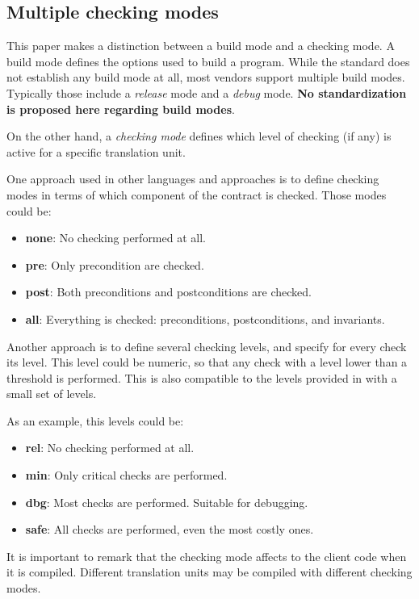 \subsection{Multiple checking modes}

This paper makes a distinction between a build mode and a checking mode. A build
mode defines the options used to build a program. While the standard does not
establish any build mode at all, most vendors support multiple build modes.
Typically those include a \emph{release} mode and a \emph{debug} mode. \textbf{No
standardization is proposed here regarding build modes}.

On the other hand, a \emph{checking mode} defines which level of checking (if any) is
active for a specific translation unit.

One approach used in other languages and approaches is to define checking modes
in terms of which component of the contract is checked.
Those modes could be:

\begin{itemize}
  \item \textbf{none}: No checking performed at all.
  \item \textbf{pre}: Only precondition are checked.
  \item \textbf{post}: Both preconditions and postconditions are checked.
  \item \textbf{all}: Everything is checked: preconditions, postconditions, and
invariants.
\end{itemize}

Another approach is to define several checking levels, and specify for every
check its level. This level could be numeric, so that any check with a level
lower than a threshold is performed. This is also compatible to the levels
provided in \cite{n4135} with a small set of levels. 

As an example, this levels could be:

\begin{itemize}
  \item \textbf{rel}: No checking performed at all.
  \item \textbf{min}: Only critical checks are performed.
  \item \textbf{dbg}: Most checks are performed. Suitable for debugging.
  \item \textbf{safe}: All checks are performed, even the most costly ones.
\end{itemize}

It is important to remark that the checking mode affects to the client code when
it is compiled. Different translation units may be compiled with different
checking modes.

